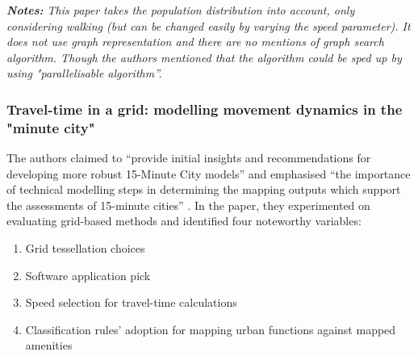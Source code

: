 \textit{\textbf{Notes:} This paper takes the population distribution into account, only considering walking (but can be changed easily by varying the speed parameter). It does not use graph representation and there are no mentions of graph search algorithm. Though the authors mentioned that the algorithm could be sped up by using  "parallelisable algorithm”.}

\subsubsection{Travel-time in a grid: modelling movement dynamics in the "minute city"}

The authors claimed to “provide initial insights and recommendations for developing more robust 15-Minute City models” and emphasised “the importance of technical modelling steps in determining the mapping outputs which support the assessments of 15-minute cities” \cite{Pezzica_Altafini_Mara_Chioni_2024}. In the paper, they experimented on evaluating grid-based methods and identified four noteworthy variables: 

\begin{enumerate}
    \item Grid tessellation choices
    \item Software application pick
    \item Speed selection for travel-time calculations
    \item Classification rules’ adoption for mapping urban functions against mapped amenities
\end{enumerate}


